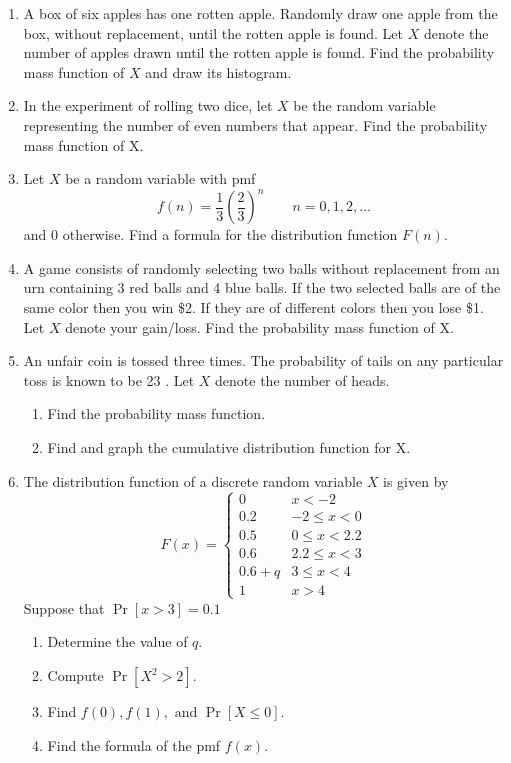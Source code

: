 \documentclass[../main.tex]{subfiles}
\begin{document}
\begin{exercises}
\begin{enumerate}
	\item %
	A box of six apples has one rotten apple. Randomly draw one apple from the
	box, without replacement, until the rotten apple is found. Let $X$ denote the
	number of apples drawn until the rotten apple is found. Find the probability
	mass function of $X$ and draw its histogram.
	
	\item %
	In the experiment of rolling two dice, let $X$ be the random variable representing 
	the number of even numbers that appear. Find the probability mass
	function of X.
	
	\item %
	Let $X$ be a random variable with pmf
	$$f(n) = \dfrac{1}{3}\left(\dfrac{2}{3}\right)^n \qquad n=0,1,2,\ldots$$
	and 0 otherwise. Find a formula for the distribution function $F(n)$.
	
	\item %
	A game consists of randomly selecting two balls without replacement from
	an urn containing 3 red balls and 4 blue balls. If the two selected balls are of
	the same color then you win \$2. If they are of different colors then you lose
	\$1. Let $X$ denote your gain/loss. Find the probability mass function of X.
	
	\item %
	An unfair coin is tossed three times. The probability of tails on any particular
	toss is known to be 23 . Let $X$ denote the number of heads.
	\begin{enumerate}
		\item Find the probability mass function.
		\item Find and graph the cumulative distribution function for X.
	\end{enumerate}

	\item %
	The distribution function of a discrete random variable $X$ is given by
	$$F(x) = 
	\begin{cases}
		0 			& x<-2 \\
		0.2			& -2 \leq x < 0 \\
		0.5			& 0 \leq x < 2.2 \\
		0.6			& 2.2 \leq x < 3 \\
		0.6 + q		& 3 \leq x < 4 \\
		1			& x > 4
	\end{cases}$$
	Suppose that $\Pr[x>3] = 0.1$
	\begin{enumerate}
		\def\itemsep{-0.5ex}
		\item Determine the value of $q$.
		\item Compute $\Pr[X^2 > 2]$.
		\item Find $f(0), f(1), \mbox{ and } \Pr[X \leq 0]$.
		\item Find the formula of the pmf $f(x)$.
	\end{enumerate}


\end{enumerate}
\end{exercises}
\end{document}
